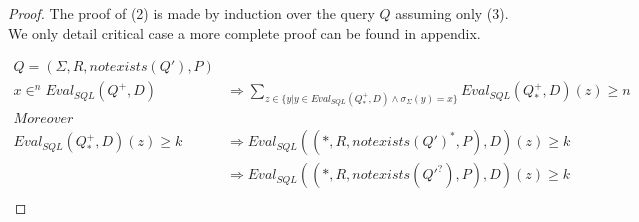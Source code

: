 \begin{proof}
	The proof of (2) is made by induction over the query $Q$ assuming only (3).
	\\We only detail critical case a more complete proof can be found in appendix.

	\begin{align*}
		Q = (\Sigma,R,notexists(Q'),P) \\
		x \in^n Eval_{SQL}(Q^+,D) & \Rightarrow \sum_{z \in \{y | y \in Eval_{SQL}(Q_*^+,D) \land \sigma_\Sigma(y) = x \} }{Eval_{SQL}(Q_*^+,D)(z)} \geq n  \\
		Moreover\\
		Eval_{SQL}(Q^+_*,D)(z)  \geq k & \Rightarrow  Eval_{SQL}((*,R,notexists(Q')^*,P),D)(z)  \geq k \\
		& \Rightarrow  Eval_{SQL}((*,R,notexists(Q'^?),P),D)(z)  \geq k \\

\end{align*}
\end{proof}
